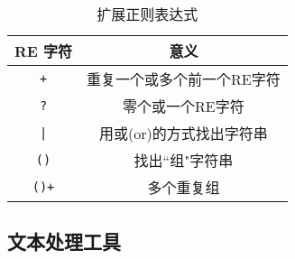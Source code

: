 \begin{table}[h]
\centering
\renewcommand{\arraystretch}{1.3}
\begin{tabular}{c|c}
\hline
  RE 字符  & 意义 \\\hline
  \texttt{+} & 重复一个或多个前一个RE字符 \\\hline
  \texttt{?} & 零个或一个RE字符 \\\hline
  \texttt| & 用或(or)的方式找出字符串 \\\hline
  \texttt{()} & 找出``组"字符串 \\\hline
  \texttt{()+} & 多个重复组 \\\hline
\end{tabular}
\caption{扩展正则表达式}
\end{table}

\newpage
\subsection{文本处理工具}
